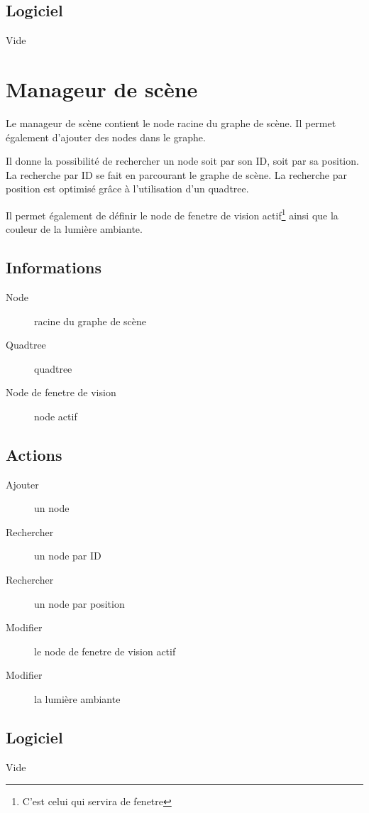\documentclass[11pt, a4paper]{article}
\begin{document}
\subsection{Logiciel}
Vide

\section{Manageur de scène}
Le manageur de scène contient le node racine du graphe de scène. Il permet également d'ajouter des nodes dans le graphe.

Il donne la possibilité de rechercher un node soit par son ID, soit par sa position.
La recherche par ID se fait en parcourant le graphe de scène.
La recherche par position est optimisé grâce à l'utilisation d'un quadtree.

Il permet également de définir le node de fenetre de vision actif\footnote{C'est celui qui servira de fenetre} ainsi que la couleur de la lumière ambiante.

\subsection{Informations}
\begin{description}
\item[Node] racine du graphe de scène
\item[Quadtree] quadtree
\item[Node de fenetre de vision] node actif
\end{description}

\subsection{Actions}
\begin{description}
\item[Ajouter] un node
\item[Rechercher] un node par ID
\item[Rechercher] un node par position
\item[Modifier] le node de fenetre de vision actif
\item[Modifier] la lumière ambiante
\end{description}

\subsection{Logiciel}
Vide
\end{document}

